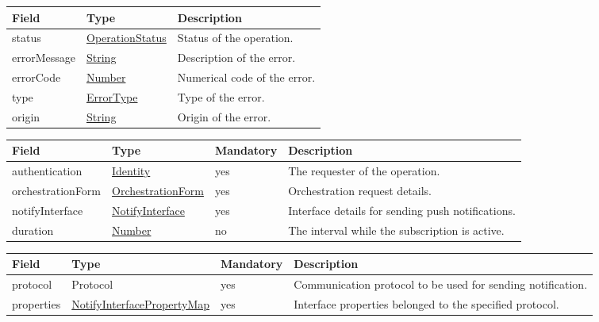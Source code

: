 \documentclass[a4paper]{arrowhead}
\newcommand{\pdef}[1]{{\textcolor{ArrowheadGrey}{#1\label{sec:model:primitives:#1}\label{sec:model:primitives:#1s}\label{sec:model:primitives:#1es}}}}
\newcommand{\pref}[1]{{\textcolor{ArrowheadGrey}{\hyperref[sec:model:primitives:#1]{#1}}}}
\begin{document}

\begin{table}[ht!]
\begin{tabularx}{\textwidth}{| p{4.25cm} | p{3.5cm} | X |} \hline
\rowcolor{gray!33} Field & Type      & Description \\ \hline
status & \pref{OperationStatus} & Status of the operation. \\ \hline
errorMessage & \pref{String} & Description of the error. \\ \hline
errorCode &\pref{Number}  & Numerical code of the error. \\ \hline
type & \pref{ErrorType} & Type of the error. \\ \hline
origin & \pref{String} & Origin of the error. \\ \hline
\end{tabularx}
\end{table}


\begin{table}[ht!]
\begin{tabularx}{\textwidth}{| p{3.2cm} | p{3.5cm} | p{2cm} | X |} \hline
\rowcolor{gray!33} Field & Type & Mandatory & Description \\ \hline
authentication & \hyperref[sec:model:Identity]{Identity} & yes & The requester of the operation. \\ \hline
orchestrationForm & \hyperref[sec:model:OrchestrationForm]{OrchestrationForm} & yes & Orchestration request details. \\ \hline
notifyInterface & \hyperref[sec:model:NotifyInterface]{NotifyInterface} & yes & Interface details for sending push notifications. \\ \hline
duration & \pref{Number} & no & The interval while the subscription is active.  \\ \hline
\end{tabularx}
\end{table}


\begin{table}[ht!]
\begin{tabularx}{\textwidth}{| p{3.2cm} | p{4.3cm} | p{2cm} | X |} \hline
\rowcolor{gray!33} Field & Type & Mandatory & Description \\ \hline
protocol & \pdef{Protocol} & yes & Communication protocol to be used for sending notification. \\ \hline
properties & \hyperref[sec:model:NotifyInterfacePropertyMap]{NotifyInterfacePropertyMap} & yes & Interface properties belonged to the specified protocol. \\ \hline
\end{tabularx}
\end{table}
\end{document}
